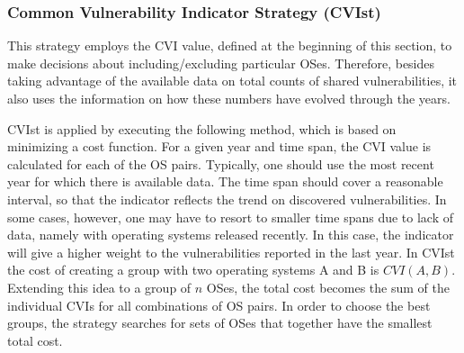 \subsubsection*{Common Vulnerability Indicator Strategy (CVIst)} This strategy employs the CVI value, defined at the beginning of this section, to make decisions about including/excluding particular OSes. Therefore, besides taking advantage of the available data on total counts of shared vulnerabilities, it also uses the information on how these numbers have evolved through the years.

CVIst is applied by executing the following method, which is based on minimizing a cost function. For a given year and time span, the CVI value is calculated for each of the OS pairs. Typically, one should use the most recent year for which there is available data. The time span should cover a reasonable interval, so that the indicator reflects the trend on discovered vulnerabilities. In some cases, however, one may have to resort to smaller time spans due to lack of data, namely with operating systems released recently. In this case, the indicator will give a higher weight to the vulnerabilities reported in the last year. In CVIst the cost of creating a group with two operating systems A and B is $\mathit{CVI}(A,B)$. Extending this idea to a group of $n$ OSes, the total cost becomes the sum of the individual CVIs for all combinations of OS pairs. In order to choose the best groups, the strategy searches for sets of OSes that together have the smallest total cost.

